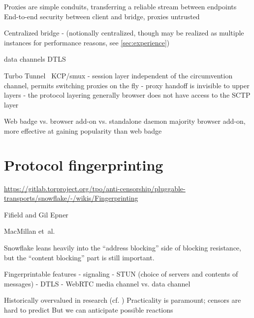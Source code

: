 \documentclass[letterpaper,twocolumn]{article}
\begin{document}

Proxies are simple conduits, transferring a reliable stream between endpoints
End-to-end security between client and bridge, proxies untrusted

Centralized bridge
- (notionally centralized, though may be realized as multiple instances for performance reasons, see \autoref{sec:experience})

data channels
DTLS
\cite[\S 1]{rfc8831}

Turbo Tunnel~\cite{Fifield2020a}
KCP/smux
- session layer independent of the circumvention channel, permits switching proxies on the fly
- proxy handoff is invisible to upper layers
- the protocol layering generally
browser does not have access to the SCTP layer

Web badge vs. browser add-on vs. standalone daemon
majority browser add-on, more effective at gaining popularity than web badge

\section{Protocol fingerprinting}
\label{sec:fingerprinting}


\url{https://gitlab.torproject.org/tpo/anti-censorship/pluggable-transports/snowflake/-/wikis/Fingerprinting}

Fifield and Gil Epner~\cite{arxiv.1605.08805}

MacMillan et~al.~\cite{arxiv.2008.03254}

Snowflake leans heavily into the ``address blocking'' side of blocking
resistance, but the ``content blocking'' part is still important.

Fingerprintable features
- signaling
- STUN (choice of servers and contents of messages)
- DTLS
- WebRTC media channel vs. data channel

Historically overvalued in research (cf. \cite{Tschantz2016a})
Practicality is paramount; censors are hard to predict
But we can anticipate possible reactions
\end{document}
